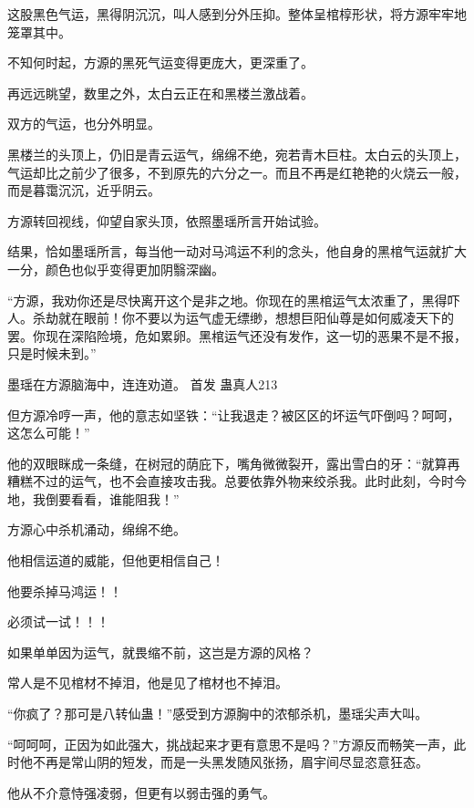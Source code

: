 
\begin{this_body}



这股黑色气运，黑得阴沉沉，叫人感到分外压抑。整体呈棺椁形状，将方源牢牢地笼罩其中。

不知何时起，方源的黑死气运变得更庞大，更深重了。

再远远眺望，数里之外，太白云正在和黑楼兰激战着。

双方的气运，也分外明显。

黑楼兰的头顶上，仍旧是青云运气，绵绵不绝，宛若青木巨柱。太白云的头顶上，气运却比之前少了很多，不到原先的六分之一。而且不再是红艳艳的火烧云一般，而是暮霭沉沉，近乎阴云。

方源转回视线，仰望自家头顶，依照墨瑶所言开始试验。

结果，恰如墨瑶所言，每当他一动对马鸿运不利的念头，他自身的黑棺气运就扩大一分，颜色也似乎变得更加阴翳深幽。

“方源，我劝你还是尽快离开这个是非之地。你现在的黑棺运气太浓重了，黑得吓人。杀劫就在眼前！你不要以为运气虚无缥缈，想想巨阳仙尊是如何威凌天下的罢。你现在深陷险境，危如累卵。黑棺运气还没有发作，这一切的恶果不是不报，只是时候未到。”

墨瑶在方源脑海中，连连劝道。  首发 蛊真人213

但方源冷哼一声，他的意志如坚铁：“让我退走？被区区的坏运气吓倒吗？呵呵，这怎么可能！”

他的双眼眯成一条缝，在树冠的荫庇下，嘴角微微裂开，露出雪白的牙：“就算再糟糕不过的运气，也不会直接攻击我。总要依靠外物来绞杀我。此时此刻，今时今地，我倒要看看，谁能阻我！”

方源心中杀机涌动，绵绵不绝。

他相信运道的威能，但他更相信自己！

他要杀掉马鸿运！！

必须试一试！！！

如果单单因为运气，就畏缩不前，这岂是方源的风格？

常人是不见棺材不掉泪，他是见了棺材也不掉泪。

“你疯了？那可是八转仙蛊！”感受到方源胸中的浓郁杀机，墨瑶尖声大叫。

“呵呵呵，正因为如此强大，挑战起来才更有意思不是吗？”方源反而畅笑一声，此时他不再是常山阴的短发，而是一头黑发随风张扬，眉宇间尽显恣意狂态。

他从不介意恃强凌弱，但更有以弱击强的勇气。


\end{this_body}
